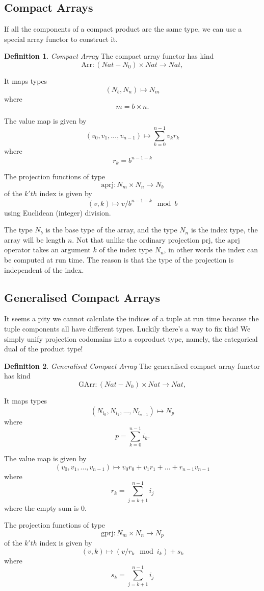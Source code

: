 \documentclass[oneside]{book}
\theoremstyle{plain}
\theoremstyle{definition}
\newtheorem{definition}{Definition}
\theoremstyle{plain}
\def\Nat{\mathit{Nat}}
\begin{document}
\subsection{Compact Arrays}
If all the components of a compact product are the same type,
we can use a special array functor to construct it.
\begin{definition} {\em Compact Array}
The compact array functor has kind 
$$\mathrm{Arr}: (Nat-N_0)\times {\Nat}\rightarrow \Nat,$$

It maps types
$$(\mathit{N}_b, \mathit{N}_n) \mapsto \mathit{N}_m$$
where 
$$m=b \times n.$$

The value map is given by
$$(v_0, v_1, ... ,v_{n-1}) \mapsto
\sum_{k=0}^{n-1} v_k r_k$$
where
$$r_k = b^{n-1-k}$$
 
The projection functions of type 
$$\mathrm{aprj}: N_m \times N_n \rightarrow N_b$$
of the $k'th$ index is given by 
$$(v,k) \mapsto v / b^{n-1-k} \mod b$$
using Euclidean (integer) division.
\end{definition}

The type $N_b$ is the base type of the array, and the type $N_n$ is
the index type, the array will be length $n$. Not that unlike the
ordinary projection $\mathrm{prj}$, the $\mathrm{aprj}$ operator takes
an argument $k$ of the index type $N_n$, in other words the index
can be computed at run time. The reason is that the type of the
projection is independent of the index.

\subsection{Generalised Compact Arrays}
It seems a pity we cannot calculate the indices of a tuple at run time
because the tuple components all have different types.
Luckily there's a way to fix this! We simply unify projection codomains
into a coproduct type, namely, the categorical dual of the product type!
\begin{definition} {\em Generalised Compact Array}
The generalised compact array functor has kind 
$$\mathrm{GArr}: (Nat-N_0)\times {\Nat}\rightarrow \Nat,$$

It maps types
$$(\mathit{N}_{i_0}, \mathit{N}_{i_1}, ... , \mathit{N_{i_{n-1}}}) \mapsto \mathit{N}_p$$
where 
$$p=\sum_{k=0}^{n-1}{i_k}.$$ 

The value map is given by
$$(v_0, v_1, ... ,v_{n-1}) \mapsto
v_0  r_0 + v_1  r_1 + ... + r_{n-1}  v_{n-1}$$
where
$$r_k = \sum_{j=k+1}^{n-1}i_j$$
where the empty sum is 0.
 
The projection functions of type 
$$\mathrm{gprj}: N_m \times N_n \rightarrow N_p$$
of the $k'th$ index is given by 
$$(v,k) \mapsto (v / r_k \mod i_k) + s_k$$
where
$$s_k = \sum_{j=k+1}^{n-1}i_j$$
\end{definition}
\end{document}

